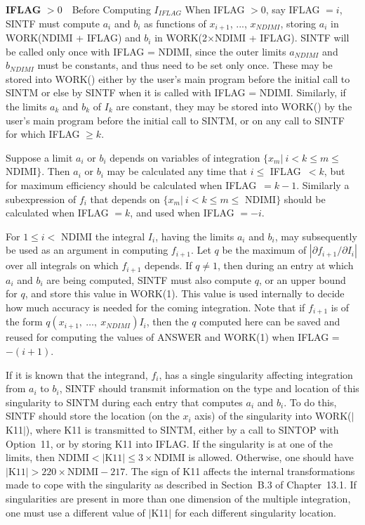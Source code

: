 \documentclass[twoside]{MATH77}
\begin{document}
{\bf IFLAG} $> 0$\ \ Before Computing $I_{IFLAG}$\newline
When IFLAG $>0$, say IFLAG $=i$, SINTF must compute $a_i$ and $b_i$ as
functions of $x_{i+1}$, ..., $x_{NDIMI}$, storing $a_i$ in WORK(NDIMI +
IFLAG) and $b_i$ in WORK(2$\times $NDIMI + IFLAG). SINTF will be called
only once with IFLAG = NDIMI, since the outer limits $a_{NDIMI}$ and
$b_{NDIMI}$ must be constants, and thus need to be set only once. These
may be stored into WORK() either by the user's main program before the
initial call to SINTM or else by SINTF when it is called with IFLAG =
NDIMI. Similarly, if the limits $a_k$ and $b_k$ of $I_k$ are constant,
they may be stored into WORK() by the user's main program before the
initial call to SINTM, or on any call to SINTF for which IFLAG $\geq k.$

Suppose a limit $a_i$ or $b_i$ depends on variables of integration $\{x_m |\
i < k \leq m \leq $ NDIMI$\}$. Then $a_i$ or $b_i$ may be calculated any
time that $i \leq $ IFLAG\ $< k$, but for maximum efficiency should be
calculated when IFLAG\ $= k-1$. Similarly a subexpression of $f_i$ that
depends on $\{x_m |\ i < k \leq m \leq $ NDIMI$\}$ should be calculated when
IFLAG $= k$, and used when IFLAG $= -i.$

For $1 \leq i <$ NDIMI the integral $I_i$, having the limits $a_i $ and $b_i$,
may subsequently be used as an argument in computing $f_{i+1}$.  Let $q$ be
the maximum of $|\partial f_{i+1}/\partial I_i|$ over all integrals on which
$f_{i+1}$ depends. If $q \neq 1$, then during an entry at which $a_i$ and
$b_i$ are being computed, SINTF must also compute $q$, or an upper bound for
$q$, and store this value in WORK(1).  This value is used internally to decide
how much accuracy is needed for the coming integration.  Note that if
$f_{i+1}$ is of the form $q(x_{i+1},\ \ldots,\ x_{NDIMI}) I_i$, then the $q$
computed here can be saved and reused for computing the values of ANSWER and
WORK(1) when IFLAG = $-(i+1)$.

If it is known that the integrand, $f_i$, has a single singularity
affecting integration from $a_i$ to $b_i$, SINTF should transmit
information on the type and location of this singularity to SINTM
during each entry that computes $a_i$ and $b_i$. To do this, SINTF
should store the location (on the $x_i$ axis) of the singularity into
WORK($|$K11$|$), where K11 is transmitted to SINTM, either by a call
to SINTOP with Option~11, or by storing K11 into IFLAG.  If the
singularity is at one of the limits, then $\text{NDIMI}< |\text{K11}|
\leq 3\times \text{NDIMI}$ is allowed.  Otherwise, one should have
$|\text{K11}| > 220\times \text{NDIMI}-217$. The sign of K11 affects
the internal transformations made to cope with the singularity as
described in Section~B.3 of Chapter~13.1.  If singularities are
present in more than one dimension of the multiple integration, one
must use a different value of $|$K11$|$ for each different
singularity location.
\end{document}

